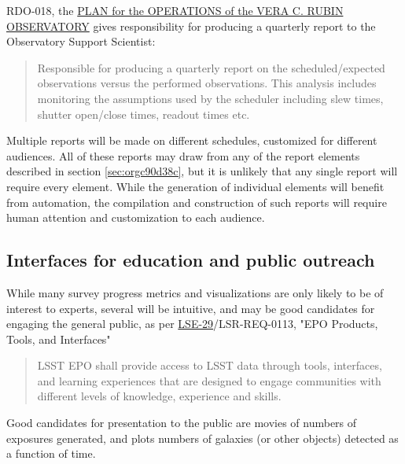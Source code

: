 RDO-018, the \href{https://docushare.lsst.org/docushare/dsweb/Get/RDO-018}{PLAN for the OPERATIONS of the VERA C. RUBIN OBSERVATORY} gives responsibility for producing a quarterly report to the Observatory Support Scientist:
\begin{quote}
Responsible for producing a quarterly report on the scheduled/expected observations versus the performed observations.
This analysis includes monitoring the assumptions used by the scheduler including slew times, shutter open/close times, readout times etc. 
\end{quote}

Multiple reports will be made on different schedules, customized for different audiences.
All of these reports may draw from any of the report elements described in section \ref{sec:orgc90d38c}, but it is unlikely that any single report will require every element.
While the generation of individual elements will benefit from automation, the compilation and construction of such reports will require human attention and customization to each audience.

\subsection{Interfaces for education and public outreach}
\label{sec:orgff92ddb}
While many survey progress metrics and visualizations are only likely to be of interest to experts, several will be intuitive, and may be good candidates for engaging the general public, as per \href{https://ls.st/lse-29}{LSE-29}/LSR-REQ-0113, "EPO Products, Tools, and Interfaces"
\begin{quote}
LSST EPO shall provide access to LSST data through tools, interfaces,
and learning experiences that are designed to engage communities with
different levels of knowledge, experience and skills.
\end{quote}
Good candidates for presentation to the public are movies of numbers of exposures generated, and plots numbers of galaxies (or other objects) detected as a function of time.

